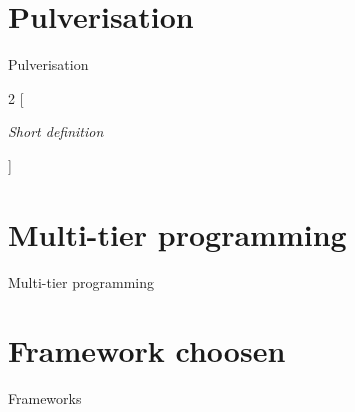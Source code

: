 \documentclass[aspectratio=169]{beamer}
\begin{document}
\section{Pulverisation}
\begin{frame}{Pulverisation}
\begin{multicols}{2}
[
  \begin{card}
  {\color{accent} \textit{Short definition} }
  \end{card}
]
\centering
{} 
\pause
{}
\end{multicols}
\end{frame}
\section{Multi-tier programming}

\begin{frame}{Multi-tier programming}

\end{frame}

\section{Framework choosen}
\begin{frame}{Frameworks}
\begin{card}[ScaFi]
\end{card}
\centering
\begin{card}[ScalaLoci]

\end{card}

\end{frame}
\end{document}
